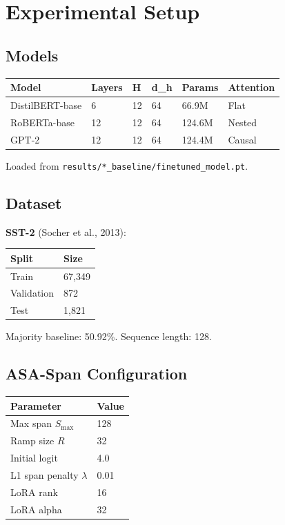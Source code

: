 
\section{Experimental Setup}

\subsection{Models}

\begin{table}[H]
\centering
\small
\begin{tabular}{llllll}
\toprule
\textbf{Model} & \textbf{Layers} & \textbf{H} & \textbf{d\_h} & \textbf{Params} & \textbf{Attention} \\
\midrule
DistilBERT-base & 6 & 12 & 64 & 66.9M & Flat \\
RoBERTa-base & 12 & 12 & 64 & 124.6M & Nested \\
GPT-2 & 12 & 12 & 64 & 124.4M & Causal \\
\bottomrule
\end{tabular}
\end{table}

Loaded from \texttt{results/*\_baseline/finetuned\_model.pt}.

\subsection{Dataset}

\textbf{SST-2} (Socher et al., 2013):

\begin{table}[H]
\centering
\small
\begin{tabular}{ll}
\toprule
\textbf{Split} & \textbf{Size} \\
\midrule
Train & 67,349 \\
Validation & 872 \\
Test & 1,821 \\
\bottomrule
\end{tabular}
\end{table}

Majority baseline: 50.92\%. Sequence length: 128.

\subsection{ASA-Span Configuration}

\begin{table}[H]
\centering
\small
\begin{tabular}{ll}
\toprule
\textbf{Parameter} & \textbf{Value} \\
\midrule
Max span $S_\text{max}$ & 128 \\
Ramp size $R$ & 32 \\
Initial logit & 4.0 \\
L1 span penalty $\lambda$ & 0.01 \\
LoRA rank & 16 \\
LoRA alpha & 32 \\
\bottomrule
\end{tabular}
\end{table}

